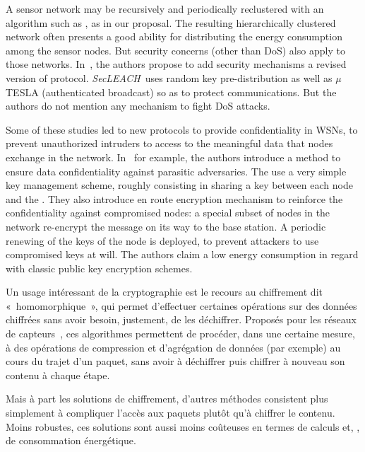 A sensor network may be recursively and periodically reclustered with an algorithm such as \leach, as in our proposal.
The resulting hierarchically clustered network often presents a good ability for distributing the energy consumption among the sensor nodes.
But security concerns (other than DoS) also apply to those networks.
In~\cite{OFVWBDL07}, the authors propose to add security mechanisms \via a revised version of \leach protocol.
\textit{SecLEACH}\ uses random key pre-distribution as well as $\mu$TESLA (authenticated broadcast) so as to protect communications.
But the authors do not mention any mechanism to fight DoS attacks.




Some of these studies led to new protocols to provide confidentiality in WSNs, \ie to prevent unauthorized intruders to access to the meaningful data that nodes exchange in the network.
In~\cite{LPH08} for example, the authors introduce a method to ensure data confidentiality against parasitic adversaries.
The use a very simple key management scheme, roughly consisting in sharing a key between each node and the \bs.
They also introduce en route encryption mechanism to reinforce the confidentiality against compromised nodes: a special subset of nodes in the network re-encrypt the message on its way to the base station.
A periodic renewing of the keys of the node is deployed, to prevent attackers to use compromised keys at will.
The authors claim a low energy consumption in regard with classic public key encryption schemes.












Un usage intéressant de la cryptographie est le recours au chiffrement dit « homomorphique », qui permet d'effectuer certaines opérations sur des données chiffrées sans avoir besoin, justement, de les déchiffrer.
Proposés pour les réseaux de capteurs~\cite{BBTY14}, ces algorithmes permettent de procéder, dans une certaine mesure, à des opérations de compression et d'agrégation de données (par exemple) au cours du trajet d'un paquet, sans avoir à déchiffrer puis chiffrer à nouveau son contenu à chaque étape.

Mais à part les solutions de chiffrement, d'autres méthodes consistent plus simplement à compliquer l'accès aux paquets plutôt qu'à chiffrer le contenu.
Moins robustes, ces solutions sont aussi moins coûteuses en termes de calculs et, \infine, de consommation énergétique.

